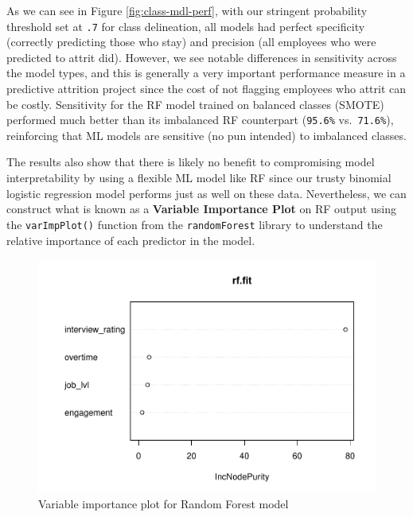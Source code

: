 \documentclass[
]{book}
\begin{document}
As we can see in Figure \ref{fig:class-mdl-perf}, with our stringent probability threshold set at \texttt{.7} for class delineation, all models had perfect specificity (correctly predicting those who stay) and precision (all employees who were predicted to attrit did). However, we see notable differences in sensitivity across the model types, and this is generally a very important performance measure in a predictive attrition project since the cost of not flagging employees who attrit can be costly. Sensitivity for the RF model trained on balanced classes (SMOTE) performed much better than its imbalanced RF counterpart (\texttt{95.6\%} vs.~\texttt{71.6\%}), reinforcing that ML models are sensitive (no pun intended) to imbalanced classes.

The results also show that there is likely no benefit to compromising model interpretability by using a flexible ML model like RF since our trusty binomial logistic regression model performs just as well on these data. Nevertheless, we can construct what is known as a \textbf{Variable Importance Plot} on RF output using the \texttt{varImpPlot()} function from the \texttt{randomForest} library to understand the relative importance of each predictor in the model.

\begin{figure}

{\centering \includegraphics[width=1\linewidth]{The_Fundamentals_of_People_Analytics_files/figure-latex/var-imp-plot-1} 

}

\caption{Variable importance plot for Random Forest model}\label{fig:var-imp-plot}
\end{figure}
\end{document}
